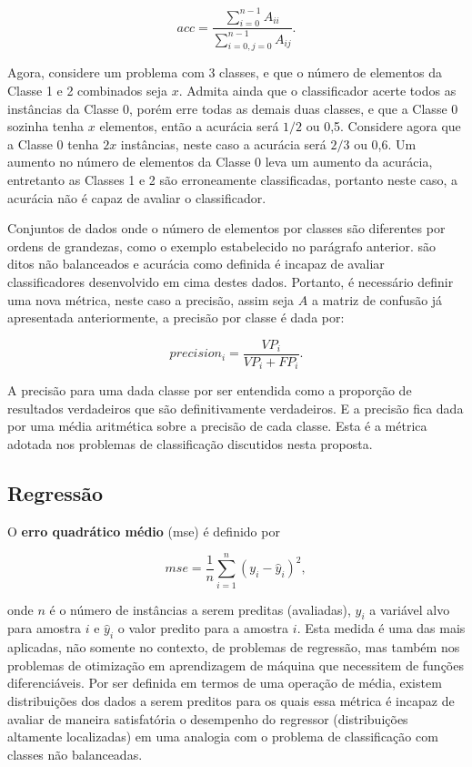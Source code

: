 \begin{equation}
acc=\frac{\sum_{i=0}^{n-1}A_{ii}}{\sum_{i=0,j=0}^{n-1}A_{ij}}\mbox{.}
\end{equation}

Agora, considere um problema com 3 classes, e que o número de elementos da Classe 1 e 2 combinados seja $x$. Admita ainda que o classificador acerte todos as instâncias da Classe 0, porém erre todas as demais duas classes, e que a Classe 0 sozinha tenha $x$ elementos, então a acurácia será $1/2$ ou 0,5. Considere agora que a Classe 0 tenha $2x$ instâncias, neste caso a acurácia será $2/3$ ou 0,6. Um aumento no número de elementos da Classe 0 leva um aumento da acurácia, entretanto as Classes 1 e 2 são erroneamente classificadas, portanto neste caso, a acurácia não é capaz de avaliar o classificador. 

Conjuntos de dados onde o número de elementos por classes são diferentes por ordens de grandezas, como o exemplo estabelecido no parágrafo anterior. são ditos não balanceados e acurácia como definida é incapaz de avaliar classificadores desenvolvido em cima destes dados. Portanto, é necessário definir uma nova métrica, neste caso a precisão, assim seja $A$ a matriz de confusão já apresentada anteriormente, a precisão por classe é dada por:

\begin{equation}
precision_i=\frac{VP_i}{VP_i+FP_i}\mbox{.}
\end{equation}

A precisão para uma dada classe por ser entendida como a proporção de resultados verdadeiros que são definitivamente verdadeiros. E a precisão fica dada por uma média aritmética sobre a precisão de cada classe. Esta é a métrica adotada nos problemas de classificação discutidos nesta proposta.

\subsection{Regressão}

O {\bf erro quadrático médio} (mse) é definido por 

\begin{equation}\label{eq:mse}
mse=\frac{1}{n}\sum_{i=1}^n(y_i-\hat{y}_i)^2\mbox{,}~
\end{equation}

onde $n$ é o número de instâncias a serem preditas (avaliadas), $y_i$ a variável alvo para amostra $i$ e $\hat{y}_i$ o valor predito para a amostra $i$. Esta medida é uma das mais aplicadas, não somente no contexto, de problemas de regressão, mas também nos problemas de otimização em aprendizagem de máquina que necessitem de funções diferenciáveis. Por ser definida em termos de uma operação de média, existem distribuições dos dados a serem preditos para os quais essa métrica é incapaz de avaliar de maneira satisfatória o desempenho do regressor (distribuições altamente localizadas) em uma analogia com o problema de classificação com classes não balanceadas. 

